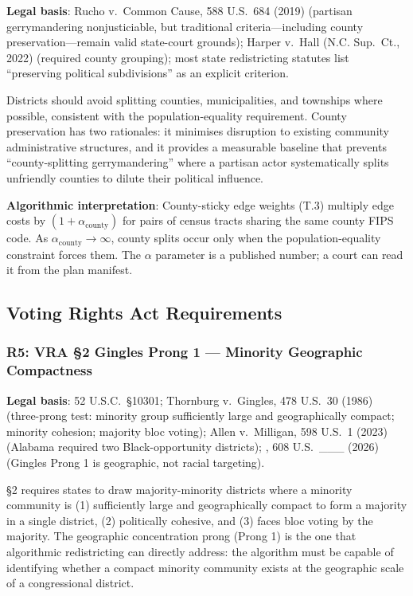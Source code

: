 \textbf{Legal basis}: Rucho v.\ Common Cause, 588 U.S.\ 684 (2019) (partisan
gerrymandering nonjusticiable, but traditional criteria---including county
preservation---remain valid state-court grounds); Harper v.\ Hall (N.C. Sup.\ Ct.,
2022) (required county grouping); most state redistricting statutes list
``preserving political subdivisions'' as an explicit criterion.

Districts should avoid splitting counties, municipalities, and townships where
possible, consistent with the population-equality requirement.
County preservation has two rationales: it minimises disruption to existing
community administrative structures, and it provides a measurable baseline that
prevents ``county-splitting gerrymandering'' where a partisan actor systematically
splits unfriendly counties to dilute their political influence.

\textbf{Algorithmic interpretation}: County-sticky edge weights (T.3) multiply
edge costs by $(1 + \alpha_\text{county})$ for pairs of census tracts sharing the
same county FIPS code.
As $\alpha_\text{county} \to \infty$, county splits occur only when the
population-equality constraint forces them.
The $\alpha$ parameter is a published number; a court can read it from the
plan manifest.

\subsection{Voting Rights Act Requirements}

\subsubsection*{R5: VRA \S2 Gingles Prong 1 --- Minority Geographic Compactness}

\textbf{Legal basis}: 52 U.S.C.\ \S10301; Thornburg v.\ Gingles, 478 U.S.\ 30
(1986) (three-prong test: minority group sufficiently large and geographically
compact; minority cohesion; majority bloc voting); Allen v.\ Milligan,
598 U.S.\ 1 (2023) (Alabama required two Black-opportunity districts);
\callais{}, 608 U.S.\ \_\_\_ (2026) (Gingles Prong 1 is geographic, not racial
targeting).

\S2 requires states to draw majority-minority districts where a minority
community is (1) sufficiently large and geographically compact to form a majority
in a single district, (2) politically cohesive, and (3) faces bloc voting by
the majority.
The geographic concentration prong (Prong 1) is the one that algorithmic
redistricting can directly address: the algorithm must be capable of identifying
whether a compact minority community exists at the geographic scale of a
congressional district.

